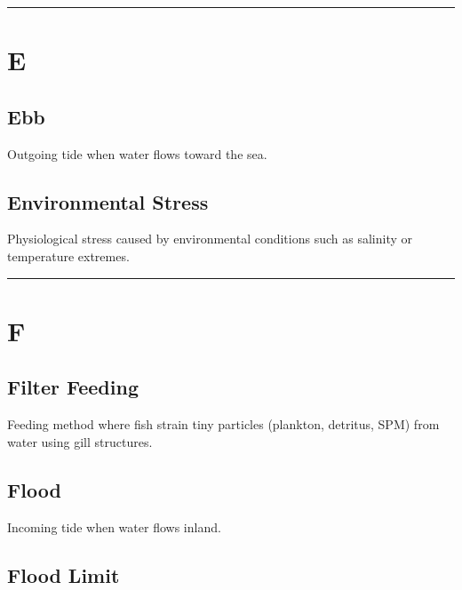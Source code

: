 \documentclass[
]{book}
\begin{document}
\begin{center}\rule{0.5\linewidth}{0.5pt}\end{center}

\section*{E}\label{e}

\subsection{\texorpdfstring{\textbf{Ebb}}{Ebb}}\label{ebb}

Outgoing tide when water flows toward the sea.

\subsection{\texorpdfstring{\textbf{Environmental Stress}}{Environmental Stress}}\label{environmental-stress}

Physiological stress caused by environmental conditions such as salinity or temperature extremes.

\begin{center}\rule{0.5\linewidth}{0.5pt}\end{center}

\section*{F}\label{f}

\subsection{\texorpdfstring{\textbf{Filter Feeding}}{Filter Feeding}}\label{filter-feeding}

Feeding method where fish strain tiny particles (plankton, detritus, SPM) from water using gill structures.

\subsection{\texorpdfstring{\textbf{Flood}}{Flood}}\label{flood}

Incoming tide when water flows inland.

\subsection{\texorpdfstring{\textbf{Flood Limit}}{Flood Limit}}\label{flood-limit}
\end{document}
